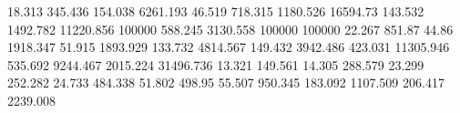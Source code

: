 18.313     345.436    %
154.038    6261.193   %
46.519     718.315    %
1180.526   16594.73   %
143.532    1492.782   %
11220.856  100000     %
588.245    3130.558   %
100000     100000     %
22.267     851.87     %
44.86      1918.347   %
51.915     1893.929   %
133.732    4814.567   %
149.432    3942.486   %
423.031    11305.946  %
535.692    9244.467   %
2015.224   31496.736  %
13.321     149.561    %
14.305     288.579    %
23.299     252.282    %
24.733     484.338    %
51.802     498.95     %
55.507     950.345    %
183.092    1107.509   %
206.417    2239.008   %
